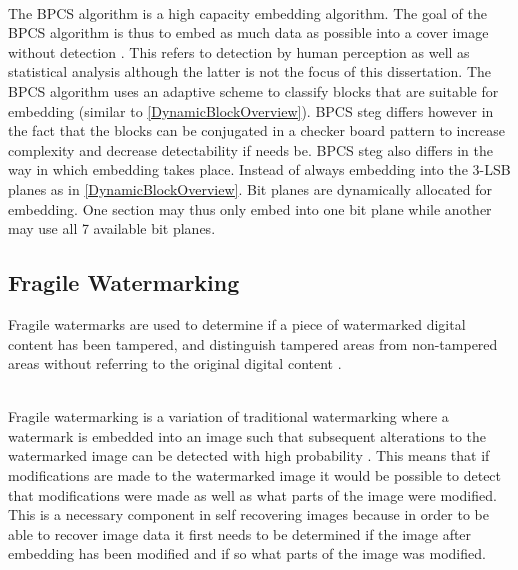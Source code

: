 \documentclass[12pt]{article}
\begin{document}
\hspace{0pt} \\
The BPCS algorithm is a high capacity embedding algorithm. The goal of the BPCS algorithm is thus to embed as much data as possible into a cover image without detection \cite{beaullieubpcs}.
This refers to detection by human perception as well as statistical analysis although the latter is not the focus of this dissertation.
The BPCS algorithm uses an adaptive scheme to classify blocks that are suitable for embedding (similar to \ref{DynamicBlockOverview}).
BPCS steg differs however in the fact that the blocks can be conjugated in a checker board pattern to increase complexity and decrease detectability if needs be.
BPCS steg also differs in the way in which embedding takes place.
Instead of always embedding into the 3-LSB planes as in \ref{DynamicBlockOverview}.
Bit planes are dynamically allocated for embedding.
One section may thus only embed into one bit plane while another may use all 7 available bit planes.

\subsection{Fragile Watermarking}
\label{introFragWatermarking}
Fragile watermarks are used to determine if a piece of watermarked digital content has been tampered, and distinguish tampered areas from non-tampered areas without referring to the original digital content \cite{liu2007image}.

\hspace{0pt} \\
Fragile watermarking is a variation of traditional watermarking where a watermark is embedded into an image such that subsequent alterations to the watermarked image can be detected with high probability \cite{lin1999review}.
This means that if modifications are made to the watermarked image it would be possible to detect that modifications were made as well as what parts of the image were modified.
This is a necessary component in self recovering images because in order to be able to recover image data it first needs to be determined if the image after embedding has been modified and if so what parts of the image was modified.
\end{document}
